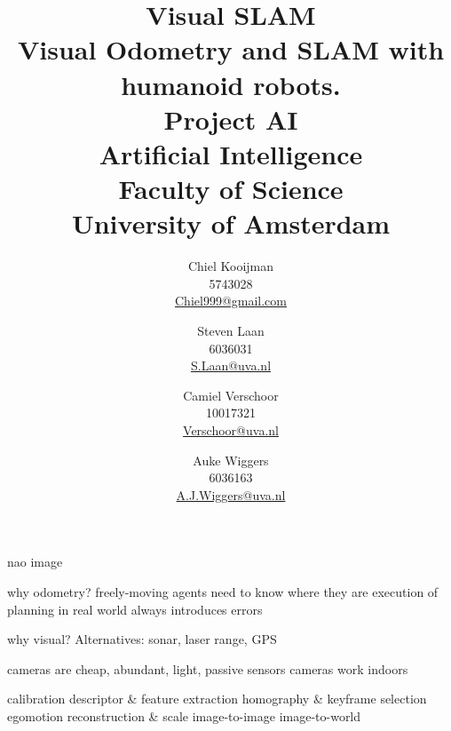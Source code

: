 \documentclass{beamer}
\author{Chiel Kooijman\\5743028\\\url{Chiel999@gmail.com} \and
Steven Laan\\6036031\\\url{S.Laan@uva.nl} \and
Camiel Verschoor\\10017321\\\url{Verschoor@uva.nl} \and
Auke Wiggers\\6036163\\\url{A.J.Wiggers@uva.nl}}
\title{Visual SLAM\\ \normalsize Visual Odometry and SLAM with humanoid
robots.\\Project AI\\Artificial Intelligence\\Faculty of Science\\ University
of Amsterdam}
\begin{document}
\begin{frame}
	nao image

	why odometry?
	freely-moving agents need to know where they are
	execution of planning in real world always introduces errors

	why visual?
	Alternatives: sonar, laser range, GPS

	cameras are cheap, abundant, light, passive sensors
	cameras work indoors
\end{frame}

\begin{frame}
	calibration
	descriptor & feature extraction
	homography & keyframe selection
	egomotion
	reconstruction & scale
	image-to-image
	image-to-world
\end{frame}



\end{document}
